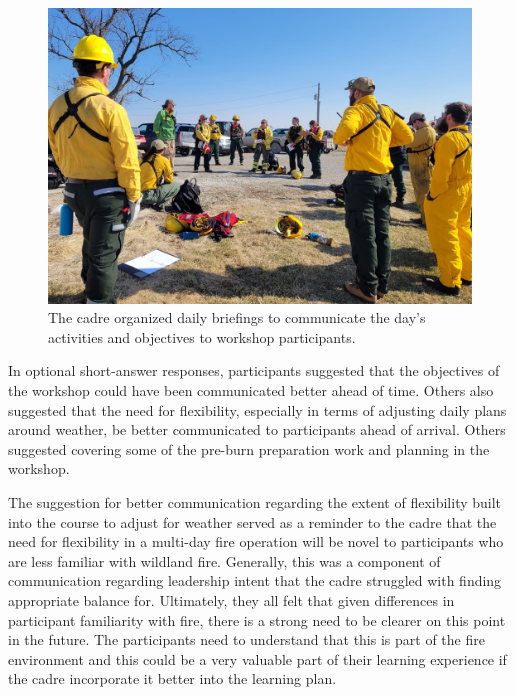 \documentclass[fire,casereport,accept,moreauthors,pdftex]{Definitions/mdpi}  %
\begin{document}
\begin{figure}[H]
\includegraphics[width=0.9\columnwidth]{BriefingCircle.jpg}
\caption{The cadre organized daily briefings to communicate the day's activities and objectives to workshop participants. }\label{briefing}
\end{figure}

In optional short-answer responses, participants suggested that the objectives of the workshop could have been communicated better ahead of time.
Others also suggested that the need for flexibility, especially in terms of adjusting daily plans around weather, be better communicated to participants ahead of arrival.
Others suggested covering some of the pre-burn preparation work and planning in the workshop.

The suggestion for better communication regarding the extent of flexibility built into the course to adjust for weather served as a reminder to the cadre that the need for flexibility in a multi-day fire operation will be novel to participants who are less familiar with wildland fire.
Generally, this was a component of communication regarding leadership intent that the cadre struggled with finding appropriate balance for. 
Ultimately, they all felt that given differences in participant familiarity with fire, there is a strong need to be clearer on this point in the future.  
The participants need to understand that this is part of the fire environment and this could be a very valuable part of their learning experience if the cadre incorporate it better into the learning plan.
\end{document}
